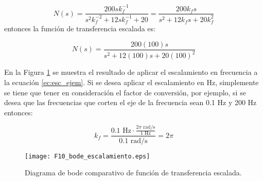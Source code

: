 	\begin{equation}
	N(s) = \frac{200sk_{f}^{-1}}{s^{2}k^{-2}_{f} + 12sk^{-1}_{f} + 20} = \frac{200k_{f}s}{s^{2} + 12 k_{f} s + 20 k^{2}_{f}}
	\end{equation}
	entonces la función de transferencia escalada es:

	\begin{equation}
		N(s)  = \frac{200(100)s}{s^{2} + 12(100)s + 20(100)^{2}}
	\end{equation}
	
	En la Figura \ref{fig:F10_bode_escalamiento} se muestra el resultado de aplicar el escalamiento en frecuencia a la ecuación \ref{ec:esc_ejem}. Si se desea aplicar el escalamiento en Hz, simplemente se tiene que tener en consideración el factor de conversión, por ejemplo, si se desea que las frecuencias que corten el eje de la frecuencia sean 0.1 Hz y 200 Hz entonces:
	
	\begin{equation}
	k_{f} = \frac{0.1 \,\,\mathrm{Hz} \cdot \frac{2 \pi \,\,\mathrm{rad/s}}{1 \,\,\mathrm{Hz}}}{0.1 \,\,\mathrm{rad/s}} = 2 \pi
	\end{equation}
	
	\begin{figure}[hbtp]
	\caption{Diagrama de bode comparativo de función de transferencia escalada.} 
	\label{fig:F10_bode_escalamiento}
	\centering
	\texttt{[image: F10\_bode\_escalamiento.eps]}
	\end{figure}
	
	